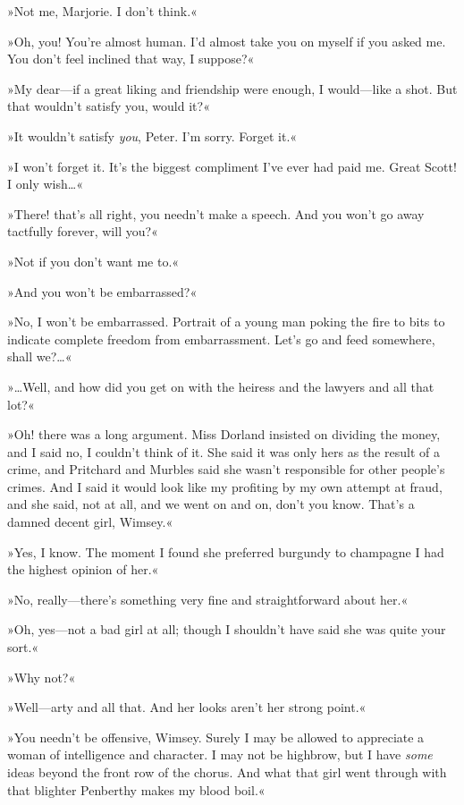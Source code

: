 »Not me, Marjorie. I don't think.«

»Oh, you! You're almost human. I'd almost take you on myself if you asked me. You don't feel inclined that way, I suppose?«

»My dear—if a great liking and friendship were enough, I would—like a shot. But that wouldn't satisfy you, would it?«

»It wouldn't satisfy \textit{you}, Peter. I'm sorry. Forget it.«

»I won't forget it. It's the biggest compliment I've ever had paid me. Great Scott! I only wish\dots«

»There! that's all right, you needn't make a speech. And you won't go away tactfully forever, will you?«

»Not if you don't want me to.«

»And you won't be embarrassed?«

»No, I won't be embarrassed. Portrait of a young man poking the fire to bits to indicate complete freedom from embarrassment. Let's go and feed somewhere, shall we?\dots«

»\dots Well, and how did you get on with the heiress and the lawyers and all that lot?«

»Oh! there was a long argument. Miss Dorland insisted on dividing the money, and I said no, I couldn't think of it. She said it was only hers as the result of a crime, and Pritchard and Murbles said she wasn't responsible for other people's crimes. And I said it would look like my profiting by my own attempt at fraud, and she said, not at all, and we went on and on, don't you know. That's a damned decent girl, Wimsey.«

»Yes, I know. The moment I found she preferred burgundy to champagne I had the highest opinion of her.«

»No, really—there's something very fine and straightforward about her.«

»Oh, yes—not a bad girl at all; though I shouldn't have said she was quite your sort.«

»Why not?«

»Well—arty and all that. And her looks aren't her strong point.«

»You needn't be offensive, Wimsey. Surely I may be allowed to appreciate a woman of intelligence and character. I may not be highbrow, but I have \textit{some} ideas beyond the front row of the chorus. And what that girl went through with that blighter Penberthy makes my blood boil.«

